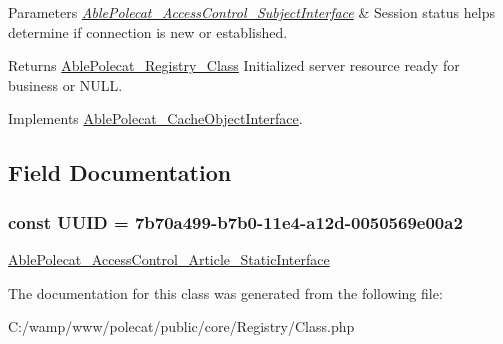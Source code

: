 \begin{DoxyParams}{Parameters}
{\em \hyperlink{interface_able_polecat___access_control___subject_interface}{Able\+Polecat\+\_\+\+Access\+Control\+\_\+\+Subject\+Interface}} & Session status helps determine if connection is new or established.\\
\hline
\end{DoxyParams}
\begin{DoxyReturn}{Returns}
\hyperlink{class_able_polecat___registry___class}{Able\+Polecat\+\_\+\+Registry\+\_\+\+Class} Initialized server resource ready for business or N\+U\+L\+L. 
\end{DoxyReturn}


Implements \hyperlink{interface_able_polecat___cache_object_interface_a3f2135f6ad45f51d075657f6d20db2cd}{Able\+Polecat\+\_\+\+Cache\+Object\+Interface}.



\subsection{Field Documentation}
\hypertarget{class_able_polecat___registry___class_a74b892c8c0b86bf9d04c5819898c51e7}{}
\subsubsection[{U\+U\+I\+D}]{\setlength{\rightskip}{0pt plus 5cm}const U\+U\+I\+D = \textquotesingle{}7b70a499-\/b7b0-\/11e4-\/a12d-\/0050569e00a2\textquotesingle{}}\label{class_able_polecat___registry___class_a74b892c8c0b86bf9d04c5819898c51e7}
\hyperlink{interface_able_polecat___access_control___article___static_interface}{Able\+Polecat\+\_\+\+Access\+Control\+\_\+\+Article\+\_\+\+Static\+Interface} 

The documentation for this class was generated from the following file\+:\begin{DoxyCompactItemize}
\item 
C\+:/wamp/www/polecat/public/core/\+Registry/Class.\+php\end{DoxyCompactItemize}
